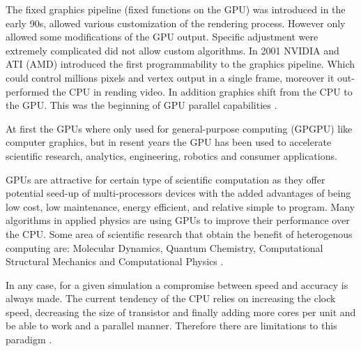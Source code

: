 The fixed graphics pipeline (fixed functions on the GPU) was introduced in the early 90s, allowed various customization of the rendering process. However only allowed some modifications of the GPU output. Specific adjustment were extremely complicated did not allow custom algorithms. In 2001 NVIDIA and ATI (AMD) introduced the first programmability to the graphics pipeline. Which could control millions pixels and vertex output in a single frame, moreover it out-performed the CPU in rending video. In addition graphics shift from the CPU to the GPU. This was the beginning of GPU parallel capabilities \cite{Nickolls}.

At first the GPUs where only used for general-purpose computing (GPGPU) like computer graphics, but in resent years the GPU has been used to accelerate scientific research, analytics, engineering, robotics and consumer applications.

GPUs are attractive for certain type of scientific computation as they offer potential seed-up of multi-processors devices with the added advantages of being low cost, low maintenance, energy efficient, and relative simple to program. Many algorithms in applied physics are using GPUs to improve their performance over the CPU. Some area of scientific research that obtain the benefit of heterogenous computing are: Molecular Dynamics, Quantum Chemistry, Computational Structural Mechanics and Computational Physics \cite{applications}.

In any case, for a given simulation a compromise between speed and accuracy is always made. The current tendency of the CPU relies on increasing the clock speed, decreasing the size of transistor and finally adding more cores per unit and be able to work and a parallel manner. Therefore there are limitations to this paradigm \cite{quantitative}.

